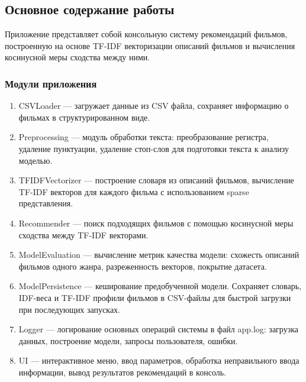 \subsection{Основное содержание работы}

Приложение представляет собой консольную систему рекомендаций фильмов, построенную на основе TF-IDF векторизации описаний фильмов и вычисления косинусной меры сходства между ними.

\subsubsection{Модули приложения}

\begin{enumerate}
    \item CSVLoader --- загружает данные из CSV файла, сохраняет информацию о фильмах в структурированном виде.
    
    \item Preprocessing --- модуль обработки текста: преобразование регистра, удаление пунктуации, удаление стоп-слов для подготовки текста к анализу моделью.
    
    \item TFIDFVectorizer --- построение словаря из описаний фильмов, вычисление TF-IDF векторов для каждого фильма с использованием sparse представления.
    
    \item Recommender --- поиск подходящих фильмов с помощью косинусной меры сходства между TF-IDF векторами.
    
    \item ModelEvaluation --- вычисление метрик качества модели: схожесть описаний фильмов одного жанра, разреженность векторов, покрытие датасета.
    
    \item ModelPersistence --- кеширование предобученной модели. Сохраняет словарь, IDF-веса и TF-IDF профили фильмов в CSV-файлы для быстрой загрузки при последующих запусках.
    
    \item Logger --- логирование основных операций системы в файл app.log: загрузка данных, построение модели, запросы пользователя, ошибки.
    
    \item UI --- интерактивное меню, ввод параметров, обработка неправильного ввода информации, вывод результатов рекомендаций в консоль.
\end{enumerate}

